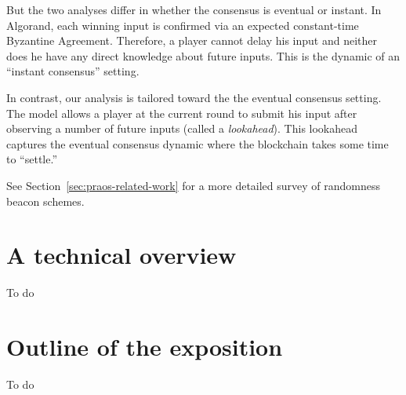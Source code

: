 But the two analyses differ in whether the consensus is eventual or instant.
In Algorand, each winning input is confirmed via 
an expected constant-time Byzantine Agreement. 
Therefore, 
a player cannot delay his input and neither does he have any direct knowledge 
about future inputs. 
This is the dynamic of an ``instant consensus'' setting.

In contrast, our analysis is tailored toward the the eventual consensus setting.
The model allows a player at the current round to 
submit his input after observing a number of future inputs 
(called a \emph{lookahead}). 
This lookahead captures the eventual consensus dynamic 
where the blockchain takes some time to ``settle.'' 

See Section~\ref{sec:praos-related-work} for 
a more detailed survey of randomness beacon schemes.



\section{A technical overview}
To do



\section{Outline of the exposition}
To do




